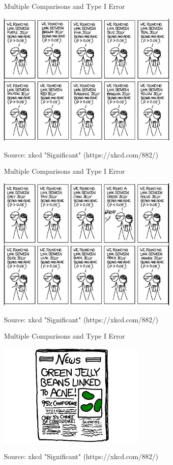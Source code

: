\begin{frame}{Multiple Comparisons and Type I Error}
\begin{center}
    \includegraphics[width=3.5in]{images/xkcd2.JPG}
\end{center}
\flushright\tiny
Source: xkcd "Significant" (https://xkcd.com/882/)
\end{frame}

\begin{frame}{Multiple Comparisons and Type I Error}
\begin{center}
    \includegraphics[width=3.5in]{images/xkcd3.JPG}
\end{center}
\flushright\tiny
Source: xkcd "Significant" (https://xkcd.com/882/)
\end{frame}

\begin{frame}{Multiple Comparisons and Type I Error}
\begin{center}
    \includegraphics[height=2in]{images/xkcd4.JPG}
\end{center}
\hfill\flushright\tiny
Source: xkcd "Significant" (https://xkcd.com/882/)
\end{frame}

